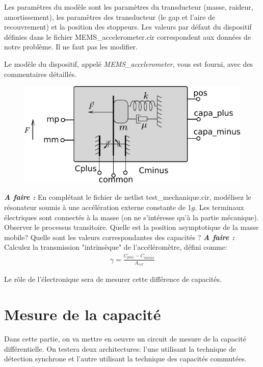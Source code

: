 \documentclass[12pt,A4,onecolumn,french]{article}
\begin{document}
Les paramètres du modèle sont les paramètres du transducteur (masse, raideur, amortissement), les paramètres des transducteur (le gap et l'aire de recouvrement) et la position des stoppeurs. Les valeurs par défaut du dispositif définies dans le fichier MEMS\_accelerometer.cir correspondent aux données de notre problème. Il ne faut pas les modifier.    

Le modèle du dispositif, appelé \emph{MEMS\_accelerometer}, vous est fourni, avec des commentaires détaillés.  

\begin{figure}
 \centering
 \includegraphics{accelerometer_model.pdf}
 \caption{ \label{fig:modele_transducteur}}
\end{figure}


\emph{\bf A faire :} En complétant le fichier de netlist test\_mechanique.cir, modélisez le résonateur soumis à une accélération externe constante de 1$g$. Les terminaux électriques sont connectés à la masse (on ne s'intéresse qu'à la partie mécanique). Observer le processus transitoire. Quelle est la position asymptotique de la masse mobile? Quelle sont les valeurs correspondantes des capacités ?
\emph{\bf A faire :} Calculez la transmission "intrinsèque" de l'accéléromètre, défini comme: 
\begin{eqnarray} 
\gamma=\frac{ C_{plus}-C_{minus}}{A_{ext}}
\end{eqnarray}

Le rôle de l'électronique sera de mesurer cette différence de capacités. 

\section{Mesure de la capacité}

Dans cette partie, on va mettre en oeuvre un circuit de mesure de la capacité différentielle. On testera deux architectures: l'une utilisant la technique de détection synchrone et l'autre utilisant la technique des capacités commutées. 
\end{document}
